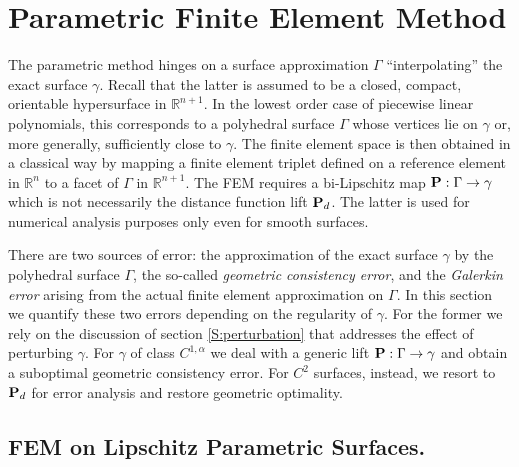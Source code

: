 
\section{Parametric Finite Element Method}\label{sec:parametric}

The parametric method hinges on a surface approximation $\Gamma$
``interpolating'' the exact surface $\gamma$.
Recall that the latter is assumed to be a closed, compact, orientable hypersurface in $\mathbb R^{n+1}$.
In the lowest order case of piecewise linear polynomials, this corresponds to a polyhedral surface $\Gamma$ whose vertices lie on $\gamma$ or, more generally, sufficiently close to $\gamma$.  The finite element space is then obtained in a classical way by mapping a finite element triplet defined on a reference element in $\mathbb R^n$ to a facet of $\Gamma$ in $\mathbb R^{n+1}$. The FEM requires a bi-Lipschitz map ${\bf P}:\Gamma\to\gamma$ which is not necessarily the distance function lift ${\bf P}_d$. The latter is used for numerical analysis purposes only even for smooth surfaces.

There are two sources of error: the approximation of the exact surface $\gamma$ by the polyhedral surface $\Gamma$, the so-called \emph{geometric consistency error}, and the \emph{Galerkin error} arising from the actual finite element approximation on $\Gamma$. In this section we quantify these two errors depending on the regularity of $\gamma$.
For the former we rely on the discussion of section \ref{S:perturbation} that addresses
the effect of perturbing $\gamma$.
For $\gamma$ of class $C^{1,\alpha}$ we deal with
a generic lift ${\bf P}:\Gamma\to\gamma$ and
obtain a suboptimal geometric consistency error.
For $C^2$ surfaces, instead, we resort to ${\bf P}_d$
for error analysis and restore geometric optimality.


\subsection{FEM on Lipschitz Parametric Surfaces.}


